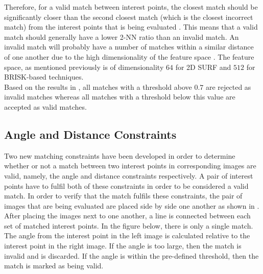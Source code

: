 \documentclass{report}
\begin{document}
Therefore, for a valid match between interest points, the closest match should be significantly closer than the second closest match (which is the closest incorrect match) from the interest points that is being evaluated \cite{Lowe2004}. This means that a valid match should generally have a lower 2-NN ratio than an invalid match. An invalid match will probably have a number of matches within a similar distance of one another due to the high dimensionality of the feature space \cite{Lowe2004}. The feature space, as mentioned previously is of dimensionality $64$ for 2D SURF and $512$ for BRISK-based techniques.\\

Based on the results in , all matches with a threshold above $0.7$ are rejected as invalid matches whereas all matches with a threshold below this value are accepted as valid matches.\\



\subsection{Angle and Distance Constraints}
\label{sec:angleDistanceConstraints}
Two new matching constraints have been developed in order to determine whether or not a match between two interest points in corresponding images are valid, namely, the angle and distance constraints respectively. A pair of interest points have to fulfil both of these constraints in order to be considered a valid match. In order to verify that the match fulfils these constraints, the pair of images that are being evaluated are placed side by side one another as shown in . After placing the images next to one another, a line is connected between each set of matched interest points. In the figure below, there is only a single match. The angle from the interest point in the left image is calculated relative to the interest point in the right image. If the angle is too large, then the match is invalid and is discarded. If the angle is within the pre-defined threshold, then the match is marked as being valid.\\
\end{document}
